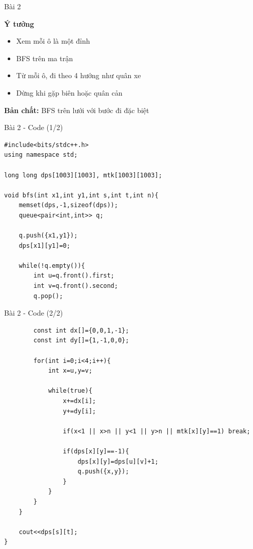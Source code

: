 \begin{frame}{Bài 2}

\textbf{Ý tưởng}

\vspace{0.4cm}

\begin{itemize}
\item Xem mỗi ô là một đỉnh
\item BFS trên ma trận
\item Từ mỗi ô, đi theo 4 hướng như quân xe
\item Dừng khi gặp biên hoặc quân cản
\end{itemize}

\vspace{0.4cm}

\textbf{\color{maincolor}Bản chất:} BFS trên lưới với bước đi đặc biệt

\end{frame}
\begin{frame}[fragile]{Bài 2 - Code (1/2)}

\begin{lstlisting}
#include<bits/stdc++.h>
using namespace std;

long long dps[1003][1003], mtk[1003][1003];

void bfs(int x1,int y1,int s,int t,int n){
    memset(dps,-1,sizeof(dps));
    queue<pair<int,int>> q;

    q.push({x1,y1});
    dps[x1][y1]=0;

    while(!q.empty()){
        int u=q.front().first;
        int v=q.front().second;
        q.pop();
\end{lstlisting}

\end{frame}
\begin{frame}[fragile]{Bài 2 - Code (2/2)}

\begin{lstlisting}
        const int dx[]={0,0,1,-1};
        const int dy[]={1,-1,0,0};

        for(int i=0;i<4;i++){
            int x=u,y=v;

            while(true){
                x+=dx[i];
                y+=dy[i];

                if(x<1 || x>n || y<1 || y>n || mtk[x][y]==1) break;

                if(dps[x][y]==-1){
                    dps[x][y]=dps[u][v]+1;
                    q.push({x,y});
                }
            }
        }
    }

    cout<<dps[s][t];
}
\end{lstlisting}

\end{frame}
